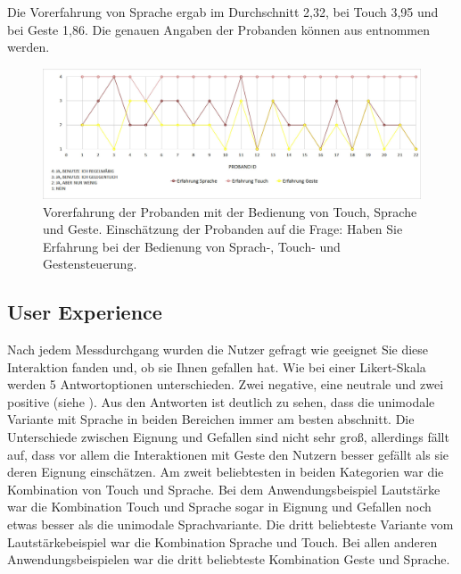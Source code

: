 Die Vorerfahrung von Sprache ergab im Durchschnitt 2,32, bei Touch 3,95 und bei Geste 1,86. Die genauen Angaben der Probanden können aus  entnommen werden.
\begin{figure}[ht]
  \centering
  \includegraphics[width=1\textwidth]{img/ErfahrungProbanden2.jpg}
  \caption[Vorerfahrung der Probanden]{Vorerfahrung der Probanden mit der Bedienung von Touch, Sprache und Geste. Einschätzung der Probanden auf die Frage: Haben Sie Erfahrung bei der Bedienung von Sprach-, Touch- und Gestensteuerung.}
  \label{fig:Vorerfahrung}
\end{figure} 
\subsection[User Experience]{User Experience}
Nach jedem Messdurchgang wurden die Nutzer gefragt wie geeignet Sie diese Interaktion fanden und, ob sie Ihnen gefallen hat. 
Wie bei einer Likert-Skala werden 5 Antwortoptionen unterschieden. Zwei negative, eine neutrale und zwei positive (siehe ). 
Aus den Antworten ist deutlich zu sehen, dass die unimodale Variante mit Sprache in beiden Bereichen immer am besten abschnitt. 
Die Unterschiede zwischen Eignung und Gefallen sind nicht sehr groß, allerdings fällt auf, dass vor allem die Interaktionen mit Geste den Nutzern besser gefällt als sie deren Eignung einschätzen. 
Am zweit beliebtesten in beiden Kategorien war die Kombination von Touch und Sprache. 
Bei dem Anwendungsbeispiel Lautstärke war die Kombination Touch und Sprache sogar in Eignung und Gefallen noch etwas besser als die unimodale Sprachvariante. 
Die dritt beliebteste Variante vom Lautstärkebeispiel war die Kombination Sprache und Touch. 
Bei allen anderen Anwendungsbeispielen war die dritt beliebteste Kombination Geste und Sprache. 

